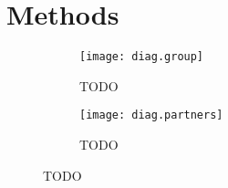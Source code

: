 \section{Methods}\label{meth}
\begin{figure}[b]
  \begin{subfigure}[b]{.47\textwidth}
    \centering\texttt{[image: diag.group]}
    \caption{TODO}
    \label{fig:diag.group}
  \end{subfigure}%
  \begin{subfigure}[b]{.53\textwidth}
    \centering\texttt{[image: diag.partners]}
    \caption{TODO}
    \label{fig:diag.partners}
  \end{subfigure}
\end{figure}
